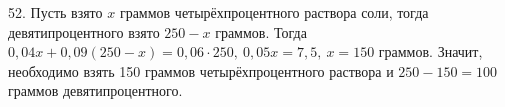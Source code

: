 52. Пусть взято $x$ граммов четырёхпроцентного раствора соли, тогда девятипроцентного взято $250-x$ граммов. Тогда $0,04x+0,09(250-x)=0,06\cdot250,\ 0,05x=7,5,\ x=150$ граммов. Значит, необходимо взять 150 граммов четырёхпроцентного раствора и $250-150=100$ граммов девятипроцентного.\\
